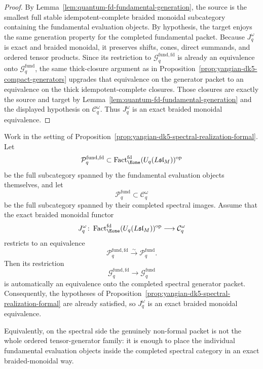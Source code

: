 \begin{proof}
By Lemma~\ref{lem:quantum-fd-fundamental-generation}, the source is the
smallest full stable idempotent-complete braided monoidal subcategory
containing the fundamental evaluation objects. By hypothesis, the
target enjoys the same generation property for the completed
fundamental packet. Because \(J_q^\omega\) is exact and braided
monoidal, it preserves shifts, cones, direct summands, and ordered
tensor products. Since its restriction to
\(\mathcal{G}^{\mathrm{fund,fd}}_{q}\) is already an equivalence onto
\(\mathcal{G}^{\mathrm{fund}}_{q}\), the same thick-closure argument as
in Proposition~\ref{prop:yangian-dk5-compact-generators} upgrades that
equivalence on the generator packet to an equivalence on the thick
idempotent-complete closures. Those closures are exactly the source
and target by Lemma~\ref{lem:quantum-fd-fundamental-generation} and the
displayed hypothesis on \(\mathcal{C}_q^\omega\). Thus \(J_q^\omega\)
is an exact braided monoidal equivalence.
\end{proof}

\begin{proposition}
\label{prop:yangian-dk5-spectral-fundamental-packet}
Work in the setting of
Proposition~\ref{prop:yangian-dk5-spectral-realization-formal}. Let
\[
\mathcal{P}^{\mathrm{fund,fd}}_{q}
\subset
\operatorname{Fact}_{\Eone}^{\mathrm{fd}}(U_q(L\mathfrak{sl}_M))^{\mathrm{op}}
\]
be the full subcategory spanned by the fundamental evaluation objects
themselves, and let
\[
\mathcal{P}^{\mathrm{fund}}_{q}
\subset
\mathcal{C}_q^\omega
\]
be the full subcategory spanned by their completed spectral images.
Assume that the exact braided monoidal functor
\[
J_q^\omega\colon
\operatorname{Fact}_{\Eone}^{\mathrm{fd}}(U_q(L\mathfrak{sl}_M))^{\mathrm{op}}
\longrightarrow
\mathcal{C}_q^\omega
\]
restricts to an equivalence
\[
\mathcal{P}^{\mathrm{fund,fd}}_{q}
\xrightarrow{\sim}
\mathcal{P}^{\mathrm{fund}}_{q}.
\]
Then its restriction
\[
\mathcal{G}^{\mathrm{fund,fd}}_{q}
\longrightarrow
\mathcal{G}^{\mathrm{fund}}_{q}
\]
is automatically an equivalence onto the completed spectral
generator packet. Consequently, the hypotheses of
Proposition~\ref{prop:yangian-dk5-spectral-realization-formal} are
already satisfied, so \(J_q^\omega\) is an exact braided monoidal
equivalence.

Equivalently, on the spectral side the genuinely non-formal packet is
not the whole ordered tensor-generator family: it is enough to place
the individual fundamental evaluation objects inside the completed
spectral category in an exact braided-monoidal way.
\end{proposition}

